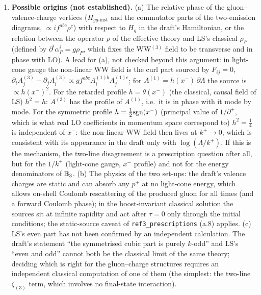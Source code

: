 \begin{enumerate}
\item \textbf{Possible origins (not established).} (a) The relative phase of the gluon--valence-charge vertices ($H_{gg\text{-inst}}$ and the commutator parts of the two-emission diagrams, $\propto if^{abc}\rho^c$) with respect to $H_g$ in the draft's Hamiltonian, or the relation between the operator $\rho$ of the effective theory and LS's classical $\rho_P$ (defined by $\partial^i\alpha^i_P=g\rho_P$, which fixes the WW$^{(3)}$ field to be transverse and in phase with LO). A lead for (a), not checked beyond this argument: in light-cone gauge the non-linear WW field is the curl part sourced by $F_{ij}=0$, $\partial_iA^{(3)}_j-\partial_jA^{(3)}_i\propto gf^{abc}A^{(1)b}_iA^{(1)c}_j$; for $A^{(1)}=h(x^-)\,\partial\Lambda$ the source is $\propto h(x^-)^2$. For the retarded profile $h=\theta(x^-)$ (the classical, causal field of LS) $h^2=h$: $A^{(3)}$ has the profile of $A^{(1)}$, i.e.\ it is in phase with it mode by mode. For the symmetric profile $h=\frac12{\rm sgn}(x^-)$ (principal value of $1/\partial^+$, which is what real LO coefficients in momentum space correspond to) $h^2=\frac14$ is independent of $x^-$: the non-linear WW field then lives at $k^+\to0$, which is consistent with its appearance in the draft only with $\log(\Lambda/k^+)$. If this is the mechanism, the two-line disagreement is a prescription question after all, but for the $1/k^+$ (light-cone gauge, $x^-$ profile) and not for the energy denominators of $\mathbb{B}_3$. (b) The physics of the two set-ups: the draft's valence charges are static and can absorb any $p^+$ at no light-cone energy, which allows on-shell Coulomb rescattering of the produced gluon for all times (and a forward Coulomb phase); in the boost-invariant classical solution the sources sit at infinite rapidity and act after $\tau=0$ only through the initial conditions; the static-source caveat of \texttt{ref3\_prescriptions} (a.8) applies. (c) LS's even part has not been confirmed by an independent calculation. The draft's statement ``the symmetrised cubic part is purely $k$-odd'' and LS's ``even and odd'' cannot both be the classical limit of the same theory; deciding which is right for the gluon--charge structures requires an independent classical computation of one of them (the simplest: the two-line $\zeta_{(3)}$ term, which involves no final-state interaction).
\end{enumerate}

